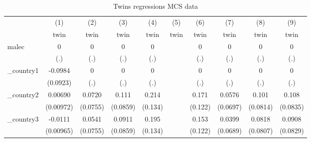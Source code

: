\begin{table}[htbp]\centering
\def\sym#1{\ifmmode^{#1}\else\(^{#1}\)\fi}
\caption{Twins regressions MCS data}
\begin{tabular}{l*{9}{c}}
\hline\hline
            &\multicolumn{1}{c}{(1)}&\multicolumn{1}{c}{(2)}&\multicolumn{1}{c}{(3)}&\multicolumn{1}{c}{(4)}&\multicolumn{1}{c}{(5)}&\multicolumn{1}{c}{(6)}&\multicolumn{1}{c}{(7)}&\multicolumn{1}{c}{(8)}&\multicolumn{1}{c}{(9)}\\
            &\multicolumn{1}{c}{twin}&\multicolumn{1}{c}{twin}&\multicolumn{1}{c}{twin}&\multicolumn{1}{c}{twin}&\multicolumn{1}{c}{twin}&\multicolumn{1}{c}{twin}&\multicolumn{1}{c}{twin}&\multicolumn{1}{c}{twin}&\multicolumn{1}{c}{twin}\\
\hline
malec       &           0         &           0         &           0         &           0         &                     &           0         &           0         &           0         &           0         \\
            &         (.)         &         (.)         &         (.)         &         (.)         &                     &         (.)         &         (.)         &         (.)         &         (.)         \\
[1em]
\_country1   &     -0.0984         &           0         &           0         &           0         &                     &           0         &           0         &           0         &           0         \\
            &    (0.0923)         &         (.)         &         (.)         &         (.)         &                     &         (.)         &         (.)         &         (.)         &         (.)         \\
[1em]
\_country2   &     0.00690         &      0.0720         &       0.111         &       0.214         &                     &       0.171         &      0.0576         &       0.101         &       0.108         \\
            &   (0.00972)         &    (0.0755)         &    (0.0859)         &     (0.134)         &                     &     (0.122)         &    (0.0697)         &    (0.0814)         &    (0.0835)         \\
[1em]
\_country3   &     -0.0111         &      0.0541         &      0.0911         &       0.195         &                     &       0.153         &      0.0399         &      0.0818         &      0.0908         \\
            &   (0.00965)         &    (0.0755)         &    (0.0859)         &     (0.134)         &                     &     (0.122)         &    (0.0689)         &    (0.0807)         &    (0.0829)         \\

\end{tabular}
\end{table}
